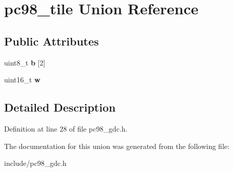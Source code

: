 \hypertarget{unionpc98__tile}{\section{pc98\-\_\-tile Union Reference}
\label{unionpc98__tile}
}
\subsection*{Public Attributes}
\begin{DoxyCompactItemize}
\item 
\hypertarget{unionpc98__tile_a1d4e5b3d3509eefc0a5f4a11d8bdea5b}{uint8\-\_\-t {\bfseries b} \mbox{[}2\mbox{]}}\label{unionpc98__tile_a1d4e5b3d3509eefc0a5f4a11d8bdea5b}

\item 
\hypertarget{unionpc98__tile_aeb46ba0689f1df876b1c4ccd8f77a022}{uint16\-\_\-t {\bfseries w}}\label{unionpc98__tile_aeb46ba0689f1df876b1c4ccd8f77a022}

\end{DoxyCompactItemize}


\subsection{Detailed Description}


Definition at line 28 of file pc98\-\_\-gdc.\-h.



The documentation for this union was generated from the following file\-:\begin{DoxyCompactItemize}
\item 
include/pc98\-\_\-gdc.\-h\end{DoxyCompactItemize}
